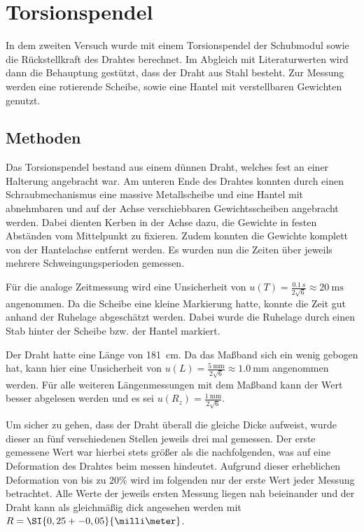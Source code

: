 
\section{Torsionspendel}
In dem zweiten Versuch wurde mit einem Torsionspendel der Schubmodul sowie die Rückstellkraft des Drahtes berechnet.
Im Abgleich mit Literaturwerten wird dann die Behauptung %
gestützt, dass der Draht aus Stahl besteht.
Zur Messung werden eine rotierende Scheibe, sowie eine Hantel mit verstellbaren Gewichten genutzt.

\subsection{Methoden}
Das Torsionspendel bestand aus einem dünnen Draht, welches fest an einer Halterung angebracht war.
Am unteren Ende des Drahtes konnten durch einen Schraubmechanismus eine massive Metallscheibe und eine Hantel mit abnehmbaren und auf der Achse verschiebbaren Gewichtsscheiben angebracht werden.
Dabei dienten Kerben in der Achse dazu, die Gewichte in festen Abständen vom Mittelpunkt zu fixieren.
Zudem konnten die Gewichte komplett von der Hantelachse entfernt werden.
Es wurden nun die Zeiten über jeweils mehrere Schweingungsperioden gemessen.

Für die analoge Zeitmessung wird eine Unsicherheit von $u(T) = \frac{\SI{0,1}{\second}}{2\sqrt{6}}\approx \SI{20}{\milli\second}$ angenommen.
Da die Scheibe eine kleine Markierung hatte, konnte die Zeit gut anhand der Ruhelage abgeschätzt werden.
Dabei wurde die Ruhelage durch einen Stab hinter der Scheibe bzw. der Hantel markiert.

Der Draht hatte eine Länge von \SI{181}{\centi\meter}.
Da das Maßband sich ein wenig gebogen hat, kann hier eine Unsicherheit von $u(L) = \frac{\SI{5}{\milli\meter}}{2\sqrt6}\approx \SI{1,0}{\milli\meter}$ angenommen werden.
Für alle weiteren Längenmessungen mit dem Maßband kann der Wert besser abgelesen werden und es sei $u(R_z) = \frac{\SI{1}{\milli\meter}}{2\sqrt{6}}$.

Um sicher zu gehen, dass der Draht überall die gleiche Dicke aufweist, wurde dieser an fünf verschiedenen Stellen jeweils drei mal gemessen.
Der erste gemessene Wert war hierbei stets größer als die nachfolgenden, was auf eine Deformation des Drahtes beim messen hindeutet.
Aufgrund dieser erheblichen Deformation von bis zu $20\%$ wird im folgenden nur der erste Wert jeder Messung betrachtet.
Alle Werte der jeweils ersten Messung liegen nah beieinander und der Draht kann als gleichmäßig dick angesehen werden mit $R = \SI{0,25 +- 0,05}{\milli\meter}$.

